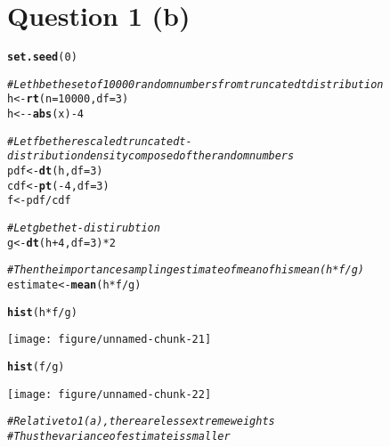 \documentclass[english]{article}\usepackage[]{graphicx}\usepackage[]{color}
\makeatletter
\def\maxwidth{ %
  \ifdim\Gin@nat@width>\linewidth
    \linewidth
  \else
    \Gin@nat@width
  \fi
}
\newcommand{\hlnum}[1]{\textcolor[rgb]{0.686,0.059,0.569}{#1}}%
\newcommand{\hlcom}[1]{\textcolor[rgb]{0.678,0.584,0.686}{\textit{#1}}}%
\newcommand{\hlopt}[1]{\textcolor[rgb]{0,0,0}{#1}}%
\newcommand{\hlstd}[1]{\textcolor[rgb]{0.345,0.345,0.345}{#1}}%
\newcommand{\hlkwb}[1]{\textcolor[rgb]{0.69,0.353,0.396}{#1}}%
\newcommand{\hlkwc}[1]{\textcolor[rgb]{0.333,0.667,0.333}{#1}}%
\newcommand{\hlkwd}[1]{\textcolor[rgb]{0.737,0.353,0.396}{\textbf{#1}}}%
\newenvironment{kframe}{%
 \def\at@end@of@kframe{}%
 \ifinner\ifhmode%
  \def\at@end@of@kframe{\end{minipage}}%
  \begin{minipage}{\columnwidth}%
 \fi\fi%
 \def\FrameCommand##1{\hskip\@totalleftmargin \hskip-\fboxsep
 \colorbox{shadecolor}{##1}\hskip-\fboxsep
     \hskip-\linewidth \hskip-\@totalleftmargin \hskip\columnwidth}%
 \MakeFramed {\advance\hsize-\width
   \@totalleftmargin\z@ \linewidth\hsize
   \@setminipage}}%
 {\par\unskip\endMakeFramed%
 \at@end@of@kframe}
\newenvironment{knitrout}{}{} %
\makeatother
\begin{document}
\section*{Question 1 (b)}

\begin{knitrout}
\color{fgcolor}\begin{kframe}
\begin{alltt}
\hlkwd{set.seed}\hlstd{(}\hlnum{0}\hlstd{)}

\hlcom{# Let h be the set of 10000 random numbers from truncated t distribution}
\hlstd{h} \hlkwb{<-} \hlkwd{rt}\hlstd{(}\hlkwc{n}\hlstd{=}\hlnum{10000}\hlstd{,} \hlkwc{df}\hlstd{=}\hlnum{3}\hlstd{)}
\hlstd{h} \hlkwb{<-} \hlopt{-}\hlkwd{abs}\hlstd{(x)}\hlopt{-}\hlnum{4}
\end{alltt}


{\ttfamily\noindent\bfseries\color{errorcolor}{\#\# Error: object 'x' not found}}\begin{alltt}
\hlcom{# Let f be the rescaled truncated t-distribution density composed of the random numbers}
\hlstd{pdf} \hlkwb{<-} \hlkwd{dt}\hlstd{(h,} \hlkwc{df}\hlstd{=}\hlnum{3}\hlstd{)}
\hlstd{cdf} \hlkwb{<-} \hlkwd{pt}\hlstd{(}\hlopt{-}\hlnum{4}\hlstd{,} \hlkwc{df}\hlstd{=}\hlnum{3}\hlstd{)}
\hlstd{f} \hlkwb{<-} \hlstd{pdf}\hlopt{/}\hlstd{cdf}

\hlcom{# Let g be the t-distirubtion }
\hlstd{g} \hlkwb{<-} \hlkwd{dt}\hlstd{(h}\hlopt{+}\hlnum{4}\hlstd{,} \hlkwc{df}\hlstd{=}\hlnum{3}\hlstd{)}\hlopt{*}\hlnum{2}

\hlcom{# Then the importance sampling estimate of mean of h is mean(h*f/g)}
\hlstd{estimate} \hlkwb{<-} \hlkwd{mean}\hlstd{(h}\hlopt{*}\hlstd{f}\hlopt{/}\hlstd{g)}

\hlkwd{hist}\hlstd{(h}\hlopt{*}\hlstd{f}\hlopt{/}\hlstd{g)}
\end{alltt}
\end{kframe}
\texttt{[image: figure/unnamed-chunk-21]} 
\begin{kframe}\begin{alltt}
\hlkwd{hist}\hlstd{(f}\hlopt{/}\hlstd{g)}
\end{alltt}
\end{kframe}
\texttt{[image: figure/unnamed-chunk-22]} 
\begin{kframe}\begin{alltt}
\hlcom{# Relative to 1(a), there are less extreme weights}
\hlcom{# Thus the variance of estimate is smaller}
\end{alltt}
\end{kframe}
\end{knitrout}
\end{document}
